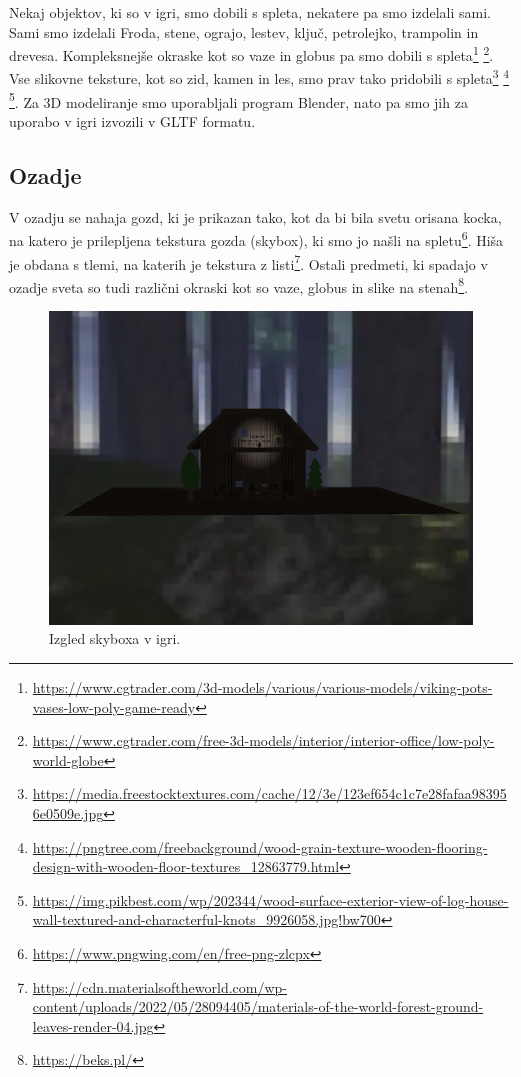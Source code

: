 \documentclass[a4paper,12pt]{article}
\begin{document}
Nekaj objektov, ki so v igri, smo dobili s spleta, nekatere pa smo izdelali sami. Sami smo izdelali Froda, stene, ograjo, lestev, ključ, petrolejko, trampolin in drevesa. Kompleksnejše okraske kot so vaze in globus pa smo dobili s spleta\footnote{\url{https://www.cgtrader.com/3d-models/various/various-models/viking-pots-vases-low-poly-game-ready}} \footnote{\url{https://www.cgtrader.com/free-3d-models/interior/interior-office/low-poly-world-globe}}. Vse slikovne teksture, kot so zid, kamen in les, smo prav tako pridobili s spleta\footnote{\url{https://media.freestocktextures.com/cache/12/3e/123ef654c1c7e28fafaa983956e0509e.jpg}} \footnote{\url{https://pngtree.com/freebackground/wood-grain-texture-wooden-flooring-design-with-wooden-floor-textures_12863779.html}} \footnote{\url{https://img.pikbest.com/wp/202344/wood-surface-exterior-view-of-log-house-wall-textured-and-characterful-knots_9926058.jpg!bw700}}. Za 3D modeliranje smo uporabljali program Blender, nato pa smo jih za uporabo v igri izvozili v GLTF formatu.

\subsection{Ozadje}
V ozadju se nahaja gozd, ki je prikazan tako, kot da bi bila svetu orisana kocka, na katero je prilepljena tekstura gozda (skybox), ki smo jo našli na spletu\footnote{\url{https://www.pngwing.com/en/free-png-zlcpx}}. Hiša je obdana s tlemi, na katerih je tekstura z listi\footnote{\url{https://cdn.materialsoftheworld.com/wp-content/uploads/2022/05/28094405/materials-of-the-world-forest-ground-leaves-render-04.jpg}}. Ostali predmeti, ki spadajo v ozadje sveta so tudi različni okraski kot so vaze, globus in slike na stenah\footnote{\url{https://beks.pl/}}.

\begin{figure}[!htb]
    \begin{center}
        \includegraphics[width=0.8\columnwidth]{skybox.jpg}
        \caption{Izgled skyboxa v igri.}
    \end{center}
\end{figure}
\end{document}
